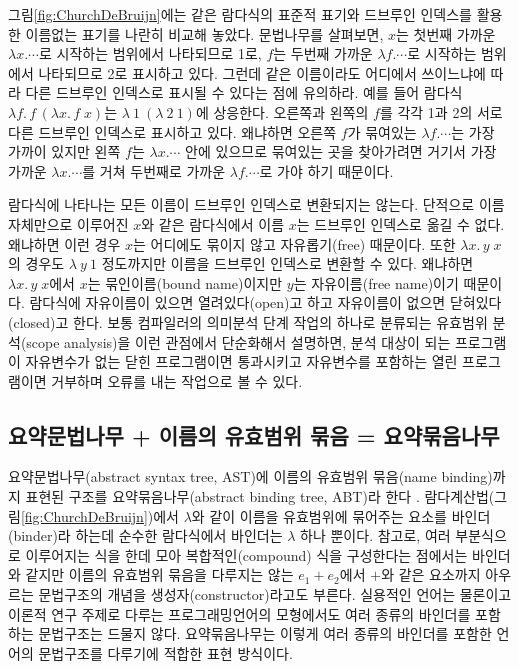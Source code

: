 그림\;\ref{fig:ChurchDeBruijn}에는 같은 람다식의 표준적 표기와
드브루인 인덱스를 활용한 이름없는 표기를 나란히 비교해 놓았다.
문법나무를 살펴보면,
$x$는 첫번째 가까운 $\lambda x.\cdots$로 시작하는 범위에서 나타되므로 1로,
$f$는 두번째 가까운 $\lambda f.\cdots$로 시작하는 범위에서 나타되므로 2로
표시하고 있다. 그런데 같은 이름이라도 어디에서 쓰이느냐에 따라 다른
드브루인 인덱스로 표시될 수 있다는 점에 유의하라. 예를 들어
람다식 $\lambda f.\,f\,(\lambda x.\,f\;x)$는 $\lambda~1~(\lambda~2~1)$에 상응한다.
오른쪽과 왼쪽의 $f$를 각각 1과 2의 서로 다른 드브루인 인덱스로 표시하고 있다.
왜냐하면 오른쪽 $f$가 묶여있는 $\lambda f.\cdots$는 가장 가까이 있지만
왼쪽 $f$는 $\lambda x.\cdots$ 안에 있으므로 묶여있는 곳을 찾아가려면
거기서 가장 가까운 $\lambda x.\cdots$를 거쳐 두번째로 가까운
$\lambda f.\cdots$로 가야 하기 때문이다.

람다식에 나타나는 모든 이름이 드브루인 인덱스로 변환되지는 않는다.
단적으로 이름 자체만으로 이루어진 $x$와 같은 람다식에서 이름 $x$는
드브루인 인덱스로 옮길 수 없다. 왜냐하면 이런 경우 $x$는 어디에도 묶이지
않고 자유롭기(free) 때문이다. 또한 $\lambda x.\,y\;x$의 경우도 
$\lambda~y~1$ 정도까지만 이름을 드브루인 인덱스로 변환할 수 있다.
왜냐하면 $\lambda x.\,y\;x$에서 $x$는 묶인이름(bound name)이지만
$y$는 자유이름(free name)이기 때문이다. 람다식에 자유이름이 있으면
열려있다(open)고 하고 자유이름이 없으면 닫혀있다(closed)고 한다.
보통 컴파일러의 의미분석 단계 작업의 하나로 분류되는
유효범위 분석(scope analysis)을 이런 관점에서 단순화해서 설명하면,
분석 대상이 되는 프로그램이 자유변수가 없는 닫힌 프로그램이면 통과시키고
자유변수를 포함하는 열린 프로그램이면 거부하며 오류를 내는 작업으로 볼 수 있다.

\subsection{요약문법나무 + 이름의 유효범위 묶음 = 요약묶음나무}
요약문법나무(abstract syntax tree, AST)에
이름의 유효범위 묶음(name binding)까지 표현된 구조를
요약묶음나무(abstract binding tree, ABT)라 한다 \cite{PFPL2nd}.
람다계산법(그림\;\ref{fig:ChurchDeBruijn})에서 $\lambda$와 같이
이름을 유효범위에 묶어주는 요소를 바인더(binder)라
하는데 순수한 람다식에서 바인더는 $\lambda$ 하나 뿐이다.
참고로, 여러 부분식으로 이루어지는 식을 한데 모아 복합적인(compound)
식을 구성한다는 점에서는 바인더와 같지만  이름의 유효범위 묶음을
다루지는 않는 $e_1 + e_2$에서 $+$와 같은 요소까지 아우르는 문법구조의
개념을 생성자(constructor)라고도 부른다.
실용적인 언어는 물론이고 이론적 연구 주제로 다루는 프로그래밍언어의
모형에서도 여러 종류의 바인더를 포함하는 문법구조는 드물지 않다.
요약묶음나무는 이렇게 여러 종류의 바인더를 포함한 언어의 문법구조를
다루기에 적합한 표현 방식이다.

